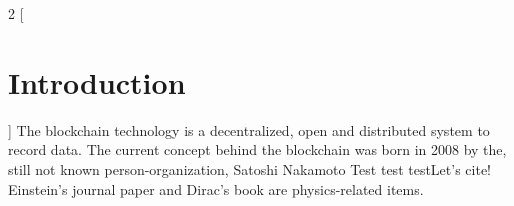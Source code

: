 \documentclass[12pt]{article}
\begin{document}
\tableofcontents
\pagebreak


\begin{multicols*}{2}
[
\section{Introduction}
]
The blockchain technology is a decentralized, open and distributed system to record data. The current concept behind the blockchain was born in 2008 by the, still not known person-organization, Satoshi Nakamoto Test test testLet's cite! Einstein's journal paper \cite{einstein} and Dirac's book \cite{dirac} are physics-related items. 



 \end{multicols*}
 
 


\pagebreak
\printbibliography %
\end{document}
